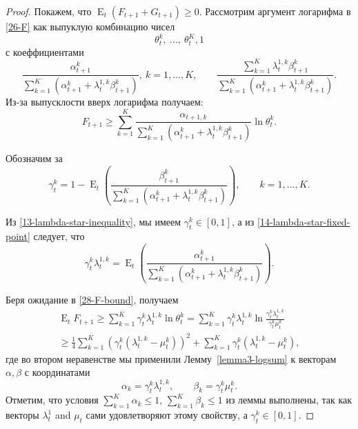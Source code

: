 \documentclass[a4paper,12pt,russian]{article} %
\theoremstyle{definition}
\DeclareMathOperator{\E}{E}
\begin{document}
\begin{proof}
Покажем, что $\E_{t}(F_{t+1} + G_{t+1}) \ge 0$.
Рассмотрим аргумент логарифма в \eqref{26-F} как выпуклую комбинацию чисел
\[
\theta_{t}^k,\ \ldots ,\ \theta_{t}^K, 1
\]
с коеффициентами
\[
\frac{\alpha_{t+1}^k}
     {\sum_{k=1}^K(\alpha_{t+1}^k + \lambda_{t}^{1,k}\beta_{t+1}^k)},
       \ k=1,\dots,K, \qquad
\frac{\sum_{k=1}^K \lambda_{t}^{1,k}\beta_{t+1}^k}
     {\sum_{k=1}^K(\alpha_{t+1}^k + \lambda_{t}^{1,k}\beta_{t+1}^k)}.
\]
Из-за выпусклости вверх логарифма получаем:
\begin{equation}
\label{28-F-bound}
F_{t+1} 
\ge \sum_{k=1}^K
  \frac{\alpha_{t+1,k}}
       {\sum_{k=1}^K (\alpha_{t+1}^k + \lambda_{t}^{1,k} \beta_{t+1}^k)}
  \ln \theta_{t}^k.
\end{equation}

Обозначим за 
\begin{equation}
\label{29-gamma-t-k}
\gamma_{t}^k 
= 1 
  - \E_t \left( 
    \frac{\beta_{t+1}^k}
         {\sum_{k=1}^K (\alpha_{t+1}^k + \lambda_{t}^{1,k} \beta_{t+1}^k)}
  \right),
  \qquad k=1,\dots,K.

\end{equation}

Из \eqref{13-lambda-star-inequality}, мы имеем $\gamma_{t}^k\in [0,1]$, а из \eqref{14-lambda-star-fixed-point} следует, что 
\begin{equation}
\label{gt-lambda}
\gamma_{t}^k \lambda_{t}^{1,k} 
= \E_t \left(
  \frac{\alpha_{t+1}^k}
       {\sum_{k=1}^K(\alpha_{t+1}^k + \lambda_{t}^{1,k} \beta_{t+1}^k)}
  \right).
\end{equation}

Беря ожидание в \eqref{28-F-bound}, получаем
\begin{multline}
\label{31-EF-bound}
\E_t F_{t+1} 
\ge \sum_{k=1}^K \gamma_{t}^k \lambda_{t}^{1,k} \ln \theta_{t}^k 
= \sum_{k=1}^K \gamma_{t}^k \lambda_{t}^{1,k} 
  \ln\frac{\gamma_{t}^k\lambda_{t}^{1,k}}{\gamma_{t}^k\mu_{t}^k} \\
\ge \frac 14\sum_{k=1}^K (\gamma_{t}^k(\lambda_{t}^{1,k} - \mu_{t}^k))^2 
  + \sum_{k=1}^K \gamma_{t}^k(\lambda_{t}^{1,k} - \mu_{t}^k),
\end{multline}
где во втором неравенстве мы применили Лемму~\ref{lemma3-logsum} к векторам $\alpha,\beta$ с координатами
\[
\alpha_k = \gamma_{t}^k\lambda_{t}^{1,k}, \qquad \beta_k = \gamma_{t}^k\mu_{t}^k.
\]
Отметим, что условия $\sum_{k=1}^K \alpha_k \le 1$, $\sum_{k=1}^K \beta_k \le 1$ из леммы выполнены, так как векторы $\lambda_t^1$ and $\mu_t$ сами удовлетворяют этому свойству, а $\gamma_{t}^k \in [0,1]$.


\end{proof}
\end{document}
